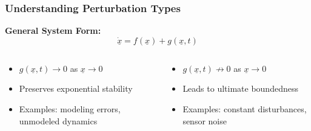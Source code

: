 \documentclass[student, noshadow, lsr, english, aspectratio=169, t]{ITR_LSR_slides}
\begin{document}
\begin{frame}
    \frametitle{Understanding Perturbation Types}


    \textbf{General System Form:}
    \[\dot{\underline{x}} = f(\underline{x}) + g(\underline{x}, t)\]

	\vspace{-0.5em}
    \begin{columns}[t,totalwidth=\textwidth]
		\begin{tcolorbox}[title=Vanishing Perturbation:]
			\begin{itemize}
				\item $g(\underline{x}, t) \to 0$ as $\underline{x} \to 0$
				\item Preserves exponential stability
				\item Examples: modeling errors, unmodeled dynamics
			\end{itemize}
		\end{tcolorbox}

        \begin{tcolorbox}[title=Non-Vanishing Perturbation:]
			\begin{itemize}
				\item $g(\underline{x}, t) \not\to 0$ as $\underline{x} \to 0$
				\item Leads to ultimate boundedness
				\item Examples: constant disturbances, sensor noise
			\end{itemize}
		\end{tcolorbox}
    \end{columns}
\end{frame}

\end{document}
